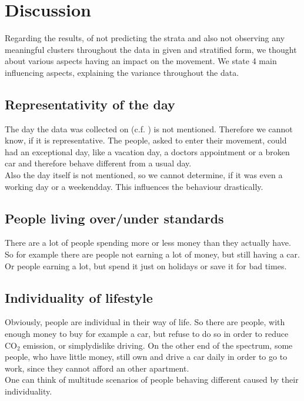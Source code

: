 	\section{Discussion} \label{sec: discussion}
	Regarding the results, of not predicting the strata and also not observing any meaningful clusters throughout the data in given and stratified form, we thought about various aspects having an impact on the movement. We state 4 main influencing aspects, explaining the variance throughout the data.
	
	\subsection{Representativity of the day}
	The day the data was collected on (c.f. ) is not mentioned. Therefore we cannot know, if it is representative. The people, asked to enter their movement, could had an exceptional day, like a vacation day, a doctors appointment or a broken car and therefore behave different from a usual day. \\
	Also the day itself is not mentioned, so we cannot determine, if it was even a working day or a weekendday. This influences the behaviour drastically.
	
	\subsection{People living over/under standards}
	There are a lot of people spending more or less money than they actually have. So for example there are people not earning a lot of money, but still having a car. Or people earning a lot, but spend it just on holidays or save it for bad times.
	

	\subsection{Individuality of lifestyle}
	Obviously, people are individual in their way of life. So there are people, with enough money to buy for example a car, but refuse to do so in order to reduce CO$_2$ emission, or simplydislike driving. On the other end of the spectrum, some people, who have little money, still own and drive a car daily in order to go to work, since they cannot afford an other apartment.\\
	One can think of multitude scenarios of people behaving different caused by their individuality.
	
